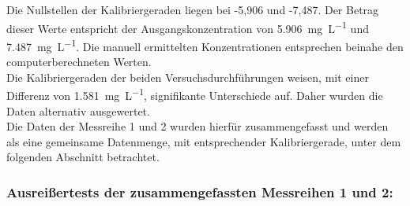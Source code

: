 	Die Nullstellen der Kalibriergeraden liegen bei -5,906 und -7,487. Der Betrag dieser Werte entspricht der Ausgangskonzentration von \SI{5,906}{\milli\gram\per\liter} und \SI{7,487}{\milli\gram\per\liter}. 
	Die manuell ermittelten Konzentrationen entsprechen beinahe den computerberechneten Werten.	\\
	
	Die Kalibriergeraden der beiden Versuchsdurchführungen weisen, mit einer Differenz von \SI{1,581}{\milli \gram \per\liter}, signifikante Unterschiede auf. Daher wurden die Daten alternativ ausgewertet.\\
	Die Daten der Messreihe 1 und 2 wurden hierfür zusammengefasst und werden als eine gemeinsame Datenmenge, mit entsprechender Kalibriergerade, unter dem folgenden Abschnitt betrachtet.
	
	\pagebreak
	
	\subsubsection*{Ausreißertests der zusammengefassten Messreihen 1 und 2:}
	
